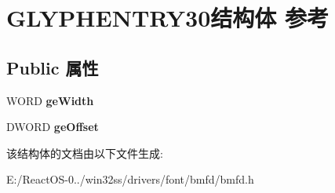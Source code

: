 \hypertarget{struct_g_l_y_p_h_e_n_t_r_y30}{}\section{G\+L\+Y\+P\+H\+E\+N\+T\+R\+Y30结构体 参考}
\label{struct_g_l_y_p_h_e_n_t_r_y30}
\subsection*{Public 属性}
\begin{DoxyCompactItemize}
\item 
\mbox{\label{struct_g_l_y_p_h_e_n_t_r_y30_aadced7077a2a0513d28edd91f97edd59}} 
W\+O\+RD {\bfseries ge\+Width}
\item 
\mbox{\label{struct_g_l_y_p_h_e_n_t_r_y30_a7d81943c19894f6458701357fedafbd1}} 
D\+W\+O\+RD {\bfseries ge\+Offset}
\end{DoxyCompactItemize}


该结构体的文档由以下文件生成\+:\begin{DoxyCompactItemize}
\item 
E\+:/\+React\+O\+S-\/0../win32ss/drivers/font/bmfd/bmfd.\+h\end{DoxyCompactItemize}
